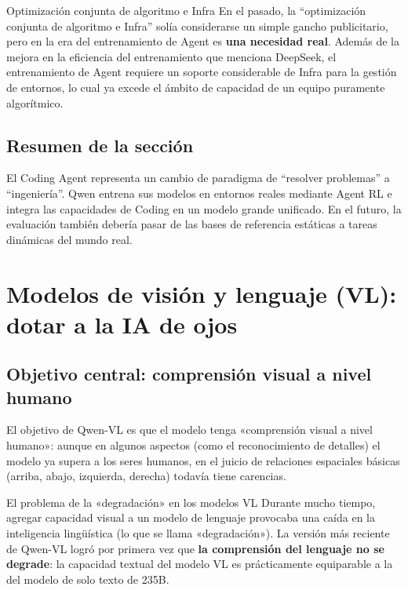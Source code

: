 \documentclass[a4paper]{article}
\begin{document}
\begin{knowledgebox}{Optimización conjunta de algoritmo e Infra}
En el pasado, la ``optimización conjunta de algoritmo e Infra'' solía considerarse un simple gancho publicitario, pero en la era del entrenamiento de Agent es \textbf{una necesidad real}. Además de la mejora en la eficiencia del entrenamiento que menciona DeepSeek, el entrenamiento de Agent requiere un soporte considerable de Infra para la gestión de entornos, lo cual ya excede el ámbito de capacidad de un equipo puramente algorítmico.
\end{knowledgebox}

\subsection{Resumen de la sección}

El Coding Agent representa un cambio de paradigma de ``resolver problemas'' a ``ingeniería''. Qwen entrena sus modelos en entornos reales mediante Agent RL e integra las capacidades de Coding en un modelo grande unificado. En el futuro, la evaluación también debería pasar de las bases de referencia estáticas a tareas dinámicas del mundo real.

\section{Modelos de visión y lenguaje (VL): dotar a la IA de ojos}

\subsection{Objetivo central: comprensión visual a nivel humano}

El objetivo de Qwen-VL es que el modelo tenga «comprensión visual a nivel humano»: aunque en algunos aspectos (como el reconocimiento de detalles) el modelo ya supera a los seres humanos, en el juicio de relaciones espaciales básicas (arriba, abajo, izquierda, derecha) todavía tiene carencias.

\begin{warningbox}{El problema de la «degradación» en los modelos VL}
Durante mucho tiempo, agregar capacidad visual a un modelo de lenguaje provocaba una caída en la inteligencia lingüística (lo que se llama «degradación»). La versión más reciente de Qwen-VL logró por primera vez que \textbf{la comprensión del lenguaje no se degrade}: la capacidad textual del modelo VL es prácticamente equiparable a la del modelo de solo texto de 235B.
\end{warningbox}
\end{document}
